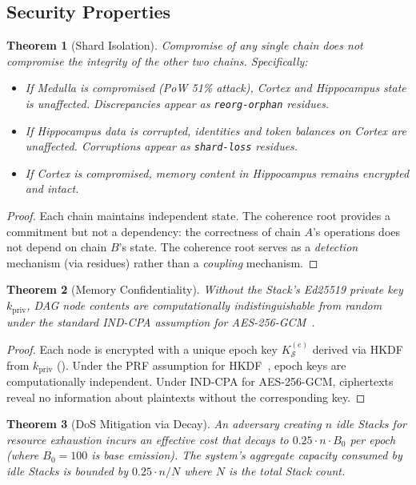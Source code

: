 \documentclass[11pt,twocolumn]{article}
\theoremstyle{definition}
\theoremstyle{plain}
\newtheorem{theorem}{Theorem}[section]
\theoremstyle{remark}
\begin{document}
\subsection{Security Properties}

\begin{theorem}[Shard Isolation]\label{thm:shard-isolation}
Compromise of any single chain does not compromise the integrity of the other two chains. Specifically:
\begin{itemize}[leftmargin=*,itemsep=1pt]
  \item If Medulla is compromised (PoW 51\% attack), Cortex and Hippocampus state is unaffected. Discrepancies appear as \texttt{reorg-orphan} residues.
  \item If Hippocampus data is corrupted, identities and token balances on Cortex are unaffected. Corruptions appear as \texttt{shard-loss} residues.
  \item If Cortex is compromised, memory content in Hippocampus remains encrypted and intact.
\end{itemize}
\end{theorem}

\begin{proof}
Each chain maintains independent state. The coherence root provides a commitment but not a dependency: the correctness of chain $A$'s operations does not depend on chain $B$'s state. The coherence root serves as a \emph{detection} mechanism (via residues) rather than a \emph{coupling} mechanism.
\end{proof}

\begin{theorem}[Memory Confidentiality]\label{thm:memory-conf}
Without the Stack's Ed25519 private key $k_{\mathrm{priv}}$, DAG node contents are computationally indistinguishable from random under the standard IND-CPA assumption for AES-256-GCM~\cite{mcgrew2004aes}.
\end{theorem}

\begin{proof}
Each node is encrypted with a unique epoch key $K^{(e)}_\mathcal{S}$ derived via HKDF from $k_{\mathrm{priv}}$ (). Under the PRF assumption for HKDF~\cite{krawczyk2010hkdf}, epoch keys are computationally independent. Under IND-CPA for AES-256-GCM, ciphertexts reveal no information about plaintexts without the corresponding key.
\end{proof}

\begin{theorem}[DoS Mitigation via Decay]\label{thm:dos}
An adversary creating $n$ idle Stacks for resource exhaustion incurs an effective cost that decays to $0.25 \cdot n \cdot B_0$ per epoch (where $B_0 = 100$ is base emission). The system's aggregate capacity consumed by idle Stacks is bounded by $0.25 \cdot n / N$ where $N$ is the total Stack count.
\end{theorem}
\end{document}
